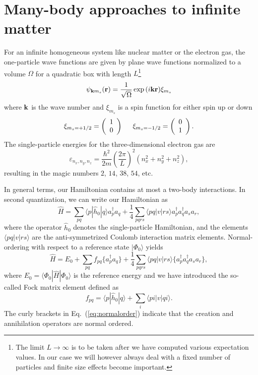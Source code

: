 \documentclass[aps,prc,twocolumn,showpacs,floatfix,nofootinbib,preprintnumbers,superscriptaddress,amsmath,amssymb]{revtex4-1}
\begin{document}
\section*{Many-body approaches to infinite matter}
For an infinite homogeneous system  like nuclear matter or the electron gas, 
the one-particle wave functions are given by plane wave functions
normalized to a volume $\Omega$ for a quadratic box with length
$L$\footnote{The limit $L\rightarrow \infty$ is to be taken after we
  have computed various expectation values. In our case we will
  however always deal with a fixed number of particles and finite size
  effects become important. }
\[
\psi_{{\bf k}m_s}({\bf r})= \frac{1}{\sqrt{\Omega}}\exp{(i{\bf kr})}\xi_{m_s}
\]
where ${\bf k}$ is the wave number and $\xi_{m_s}$ is a spin function
for either spin up or down
\[ 
\xi_{m_{s}=+1/2}=\left(\begin{array}{c} 1
  \\ 0 \end{array}\right) \hspace{0.5cm}
\xi_{m_{s}=-1/2}=\left(\begin{array}{c} 0 \\ 1 \end{array}\right).\]
The single-particle energies for the three-dimensional electron gas
are
\[    
\varepsilon_{n_{x}, n_{y}, n_{z}} = \frac{\hbar^{2}}{2m}\left( \frac{2\pi }{L}\right)^{2}(n_{x}^{2}+n_{y}^{2}+n_{z}^{2}),
\]
resulting in the magic numbers $2$, $14$, $38$, $54$, etc.  

In general terms, our Hamiltonian contains at most a two-body
interactions. In second quantization, we can write our Hamiltonian as
\begin{equation}
\hat{H}= \sum_{pq}\langle p | \hat{h}_0 | q \rangle a_p^{\dagger} a_q + \frac{1}{4}\sum_{pqrs}\langle pq |v| r s \rangle a_p^{\dagger} a_q^{\dagger} a_s a_r,
\label{eq:ourHamiltonian}
\end{equation} 
where the operator $\hat{h}_0$ denotes the single-particle
Hamiltonian, and the elements $\langle pq|v|rs\rangle$ are the
anti-symmetrized Coulomb interaction matrix elements.  Normal-ordering
with respect to a reference state $|\Phi_0\rangle$ yields
\begin{equation}
\hat{H}=E_0 + \sum_{pq}f_{pq}\lbrace a_p^{\dagger} a_q\rbrace + \frac{1}{4}\sum_{pqrs}\langle pq |v| r s \rangle \lbrace a_p^{\dagger} a_q^{\dagger} a_s a_r \rbrace,
\label{eq:normalorder}
\end{equation}
where $E_0=\langle\Phi_0| \hat{H}| \Phi_0\rangle$ is the reference energy
and we have introduced the so-called  Fock matrix element defined as
\begin{equation}
f_{pq} = \langle p|\hat{h}_0| q \rangle + \sum\limits_{i} \langle pi |v| qi\rangle.
\label{eq:fockelement}
\end{equation}
The curly brackets in Eq.~(\ref{eq:normalorder}) indicate that the
creation and annihilation operators are normal ordered.
\end{document}
